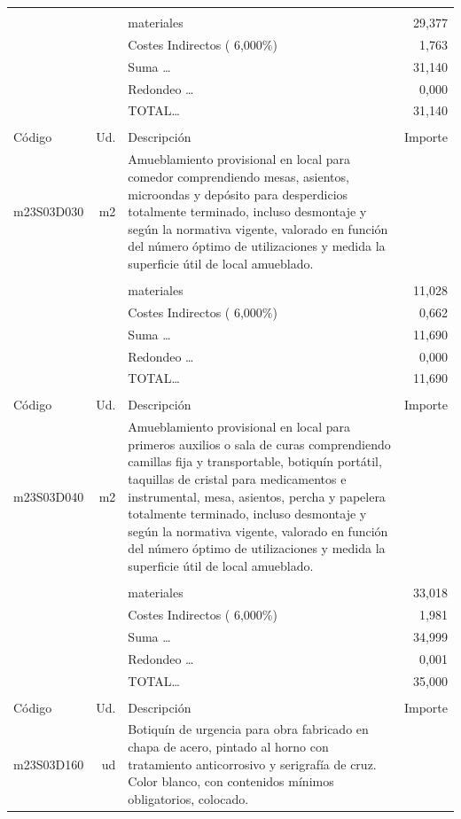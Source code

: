 \documentclass{book}%
\begin{document}
\begin{supertabular}{l r p{60mm} r}
&&&\\%
&&materiales&    29,377\\%
&&Costes Indirectos (     6,000\%)&     1,763\\%
&&Suma \ldots&    31,140\\%
&&Redondeo \ldots&     0,000\\%
%
&&TOTAL\ldots&    31,140\\%
&&&\\%
Código&Ud.&Descripción&Importe\\%
\hline%
m23S03D030&m2&Amueblamiento provisional en local para comedor comprendiendo mesas, asientos, microondas y depósito para desperdicios totalmente terminado, incluso desmontaje y según la normativa vigente, valorado en función del número óptimo de utilizaciones y medida la superficie útil de local amueblado.&\\%
&&&\\%
&&materiales&    11,028\\%
&&Costes Indirectos (     6,000\%)&     0,662\\%
&&Suma \ldots&    11,690\\%
&&Redondeo \ldots&     0,000\\%
%
&&TOTAL\ldots&    11,690\\%
&&&\\%
Código&Ud.&Descripción&Importe\\%
\hline%
m23S03D040&m2&Amueblamiento provisional en local para primeros auxilios o sala de curas comprendiendo camillas fija y transportable, botiquín portátil, taquillas de cristal para medicamentos e instrumental, mesa, asientos, percha y papelera totalmente terminado, incluso desmontaje y según la normativa vigente, valorado en función del número óptimo de utilizaciones y medida la superficie útil de local amueblado.&\\%
&&&\\%
&&materiales&    33,018\\%
&&Costes Indirectos (     6,000\%)&     1,981\\%
&&Suma \ldots&    34,999\\%
&&Redondeo \ldots&     0,001\\%
%
&&TOTAL\ldots&    35,000\\%
&&&\\%
Código&Ud.&Descripción&Importe\\%
\hline%
m23S03D160&ud&Botiquín de urgencia para obra fabricado en chapa de acero, pintado al horno con tratamiento anticorrosivo y serigrafía de cruz. Color blanco, con contenidos mínimos obligatorios, colocado.&\\%

\end{supertabular}
\end{document}
